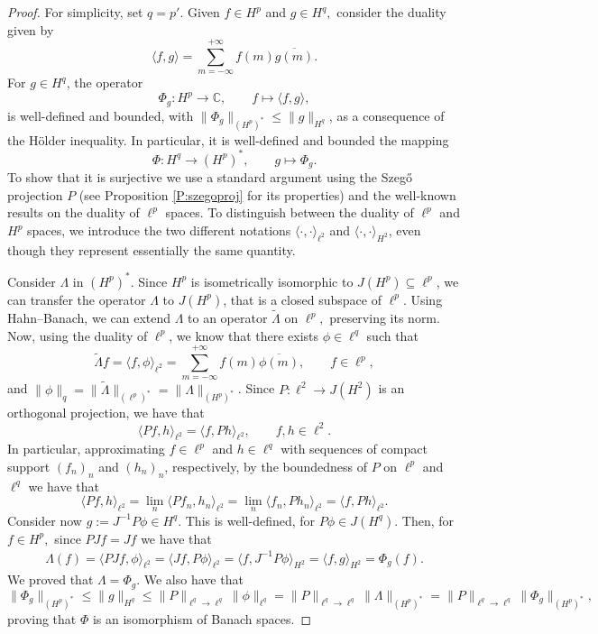 \documentclass[12pt,a4paper,reqno]{amsart}
\theoremstyle{definition}
\theoremstyle{definition}\newtheorem{defn}[thm]{Definition}
\begin{document}
    \begin{proof}
    For simplicity, set $q=p'$. Given $f\in H^p$ and $g\in H^q,$ consider the duality given by 
    \[
    \langle f,g\rangle = \sum_{m=-\infty}^{+\infty}f(m)\overline{g(m)}.
    \]
    For $g\in H^q$, the operator
    \[
    \Phi_g \colon H^p\to\mathbb{C}, \qquad f\mapsto \langle f,g\rangle,
    \]
    is well-defined and bounded, with $\|\Phi_g\|_{(H^p)^*}\leqslant \|g\|_{H^q}$, as a consequence of the H\"older inequality. In particular, it is well-defined and bounded the mapping
    \[
    \Phi \colon H^q \to (H^p)^*, \qquad g\mapsto \Phi_g.
    \]
    To show that it is surjective we use a standard argument using the Szeg\H o projection $P$ (see Proposition \ref{P:szegoproj} for its properties) and the well-known results on the duality of $\ell^p$ spaces. To distinguish between the duality of $\ell^p$ and $H^p$ spaces, we introduce the two different notations $\langle\cdot,\cdot\rangle_{\ell^2}$ and $\langle\cdot,\cdot\rangle_{H^2}$, even though they represent essentially the same quantity. 
    
    Consider $\Lambda$ in $(H^p)^*$. Since $H^p$ is isometrically isomorphic to $J(H^p)\subseteq \ell^p$, we can transfer the operator $\Lambda$ to $J(H^p)$, that is a closed subspace of $\ell^p$. Using Hahn--Banach, we can extend $\Lambda$ to an operator $\widetilde{\Lambda}$ on $\ell^p,$ preserving its norm. Now, using the duality of $\ell^p$, we know that there exists $\phi\in\ell^q$ such that
    \[
    \widetilde{\Lambda} f=\langle f,\phi\rangle_{\ell^2}=\sum_{m=-\infty}^{+\infty}f(m)\overline{\phi(m)}, \qquad f\in\ell^p,
    \]
    and $\|\phi\|_{q}=\|\widetilde{\Lambda}\|_{(\ell^p)^*}=\|\Lambda\|_{(H^p)^*}$. Since $P\colon \ell^2\to J(H^2)$ is an orthogonal projection, we have that
    \[
    \langle Pf,h\rangle_{\ell^2} = \langle f,Ph\rangle_{\ell^2} ,\qquad f,h\in\ell^2.
    \]
    In particular, approximating $f\in\ell^p$ and $h\in\ell^q$ with sequences of compact support $(f_n)_n$ and $(h_n)_n$, respectively, by the boundedness of $P$ on $\ell^p$ and $\ell^q$ we have that
    \[
    \langle Pf,h\rangle_{\ell^2} = \lim_n \langle Pf_n,h_n\rangle_{\ell^2} = \lim_n \langle f_n,Ph_n\rangle_{\ell^2} = \langle f,Ph\rangle_{\ell^2}. 
    \]
    Consider now $g:=J^{-1}P\phi\in H^q$. This is well-defined, for $P\phi\in J(H^q)$. Then, for $f\in H^p,$ since $PJf=Jf$ we have that
    \begin{align*}
        \Lambda(f)=\langle PJf, \phi\rangle_{\ell^2}=\langle Jf, P\phi\rangle_{\ell^2}=\langle f, J^{-1}P\phi\rangle_{H^2}=\langle f, g\rangle_{H^2}=\Phi_g(f).
    \end{align*}
    We proved that $\Lambda = \Phi_g$. We also have that
    \[
    \|\Phi_g\|_{(H^p)^*}\leqslant \|g\|_{H^q}\leqslant \|P\|_{\ell^q\to \ell^q}\|\phi\|_{\ell^q}=\|P\|_{\ell^q\to \ell^q}\|\Lambda\|_{(H^p)^*}=\|P\|_{\ell^q\to \ell^q}\|\Phi_g\|_{(H^p)^*},
    \]
    proving that $\Phi$ is an isomorphism of Banach spaces.
    \end{proof}
    
\end{document}
